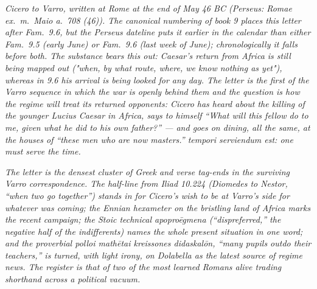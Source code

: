 
\textit{Cicero to Varro, written at Rome at the end of May 46 BC
(Perseus: \textit{Romae ex.~m.~Maio a.~708 (46)}). The canonical
numbering of book 9 places this letter after \textit{Fam.}~9.6, but
the Perseus dateline puts it earlier in the calendar than either
\textit{Fam.}~9.5 (early June) or \textit{Fam.}~9.6 (last week of
June); chronologically it falls before both. The substance bears
this out: Caesar's return from Africa is still being mapped out
("when, by what route, where, we know nothing as yet"), whereas
in 9.6 his arrival is being looked for any day. The letter is the
first of the Varro sequence in which the war is openly behind them
and the question is how the regime will treat its returned
opponents: Cicero has heard about the killing of the younger
Lucius Caesar in Africa, says to himself ``What will this fellow
do to me, given what he did to his own father?'' --- and goes on
dining, all the same, at the houses of ``these men who are now
masters.'' \textit{tempori serviendum est}: one must serve the
time.}

\textit{The letter is the densest cluster of Greek and verse
tag-ends in the surviving Varro correspondence. The half-line from
\textit{Iliad} 10.224 (Diomedes to Nestor, ``when two go
together'') stands in for Cicero's wish to be at Varro's side for
whatever was coming; the Ennian hexameter on the bristling land of
Africa marks the recent campaign; the Stoic technical
\textit{apoproēgmena} (``dispreferred,'' the negative half of the
indifferents) names the whole present situation in one word; and
the proverbial \textit{polloi mathētai kreissones didaskalōn},
``many pupils outdo their teachers,'' is turned, with light irony,
on Dolabella as the latest source of regime news. The register is
that of two of the most learned Romans alive trading shorthand
across a political vacuum.}
